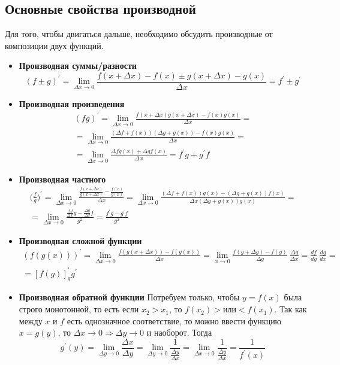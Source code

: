 \subsection{Основные свойства производной}
Для того, чтобы двигаться дальше, необходимо обсудить производные от композиции двух функций.
\begin{itemize}
    \item \textbf{Производная суммы/разности}
    \begin{equation*}
        (f \pm g)^{'} = \lim_{\Delta x \rightarrow 0} \frac{f(x + \Delta x) - f(x) \pm g(x + \Delta x) - g(x)}{\Delta x} = f^{'} \pm g^{'}
    \end{equation*}
    \item \textbf{Производная произведения}
    \begin{multline*}
        (fg)^{'} = \lim_{\Delta x \rightarrow 0} \frac{f(x + \Delta x)g(x + \Delta x) - f(x)g(x)}{\Delta x} = \\
        =\lim_{\Delta x \rightarrow 0} \frac{(\Delta f + f(x))(\Delta g + g(x)) - f(x)g(x)}{\Delta x} = \\
        = \lim_{\Delta x \rightarrow 0} \frac{\Delta f g(x) + \Delta g f(x)}{\Delta x} = f^{'}g + g^{'} f
    \end{multline*}
    \item \textbf{Производная частного}
    \begin{multline*}
        \bigl(\frac{f}{g} \bigr)^{'} = \lim_{\Delta x \rightarrow 0} \frac{\frac{f(x + \Delta x)}{g(x + \Delta x)} - \frac{f(x)}{g(x)}}{\Delta x} = \lim_{\Delta x \rightarrow 0} \frac{(\Delta f + f(x))g(x) - (\Delta g + g(x))f(x)}{\Delta x (\Delta g + g(x)) g(x)} =\\
        = \lim_{\Delta x \rightarrow 0} \frac{\frac{\Delta f}{\Delta x} g - \frac{\Delta g}{\Delta x} f}{g^2} = \frac{f^{'} g - g^{'} f}{g^2}
    \end{multline*}
    \item \textbf{Производная сложной функции}
    \begin{multline*}
        (f(g(x)))^{'} = \lim_{\Delta x \rightarrow 0} \frac{f(g(x + \Delta x)) - f(g(x))}{\Delta x} = \lim_{x \rightarrow 0}\frac{f(g + \Delta g) - f(g)}{\Delta g}\ \frac{\Delta g}{\Delta x} = \frac{df}{dg}\ \frac{dg}{dx} =\\
        = [f(g)]^{'}_{g} g^{'}
    \end{multline*}
    \item \textbf{Производная обратной функции}
    Потребуем только, чтобы $y=f(x)$ была строго монотонной, то есть если $x_2 > x_1$, то $f(x_2) > или < f(x_1)$. Так как между $x$ и $f$ есть однозначное соответствие, то можно ввести функцию $x = g(y)$, то $\Delta x \rightarrow 0 \Rightarrow \Delta y \rightarrow 0$ и наоборот. Тогда 
    \begin{equation*}
        g^{'}(y) = \lim_{\Delta y \rightarrow 0} \frac{\Delta x}{\Delta y} = \lim_{\Delta y \rightarrow 0} \frac{1}{\frac{\Delta y}{\Delta x}} =\lim_{\Delta x \rightarrow 0} \frac{1}{\frac{\Delta y}{\Delta x}} = \frac{1}{f^{'}(x)}
    \end{equation*}
\end{itemize}

